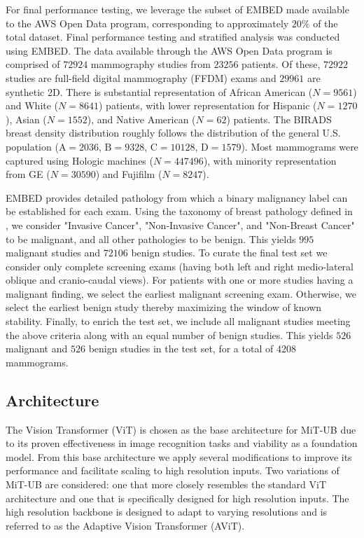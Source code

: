 \documentclass[12pt]{article}
\begin{document}
For final performance testing, we leverage the subset of EMBED \cite{embed2023} made available to the AWS Open Data program, 
corresponding to approximately $20\%$ of the total dataset.
Final performance testing and stratified analysis was conducted using EMBED. The data available through the AWS Open Data program is comprised of $72924$ mammography studies from $23256$ patients. Of these, $72922$ studies are  full-field digital mammography (FFDM) exams and $29961$ are synthetic 2D.
There is substantial representation of African American ($N=9561$) and White ($N=8641$) patients, with lower representation for Hispanic ($N=1270$), Asian ($N=1552$), and Native American ($N=62$) patients. The BIRADS breast density distribution roughly follows the distribution of the general U.S. population ($\mathrm{A}=2036$, $\mathrm{B}=9328$, $\mathrm{C}=10128$, $\mathrm{D}=1579$). Most mammograms were captured using Hologic machines ($N=447496$), with minority representation from GE ($N=30590$) and Fujifilm ($N=8247$).

EMBED provides detailed pathology from which a binary malignancy label can be established for each exam. Using the taxonomy
of breast pathology defined in \cite{embed2023}, we consider "Invasive Cancer", "Non-Invasive Cancer", and "Non-Breast Cancer" to be malignant, and all other pathologies to be benign. This yields $995$ malignant studies and $72106$ benign studies.
To curate the final test set we consider only complete screening exams (having both left and right medio-lateral oblique and cranio-caudal views). For patients with one or more studies having a malignant finding, we select the earliest malignant screening exam.
Otherwise, we select the earliest benign study thereby maximizing the window of known stability. 
Finally, to enrich the test set, we include all malignant studies meeting the above criteria along with an equal number of benign studies. 
This yields $526$ malignant and $526$ benign studies in the test set, for a total of $4208$ mammograms.

\subsection{Architecture}

The Vision Transformer (ViT) \cite{dosovitskiy2020vit} is chosen as the base architecture for MiT-UB due to its proven effectiveness in image recognition tasks and viability as a foundation model. From this base architecture we apply several
modifications to improve its performance and facilitate scaling to high resolution inputs. Two variations of MiT-UB are
considered: one that more closely resembles the standard ViT architecture and one that is specifically designed for high resolution inputs. The high resolution backbone is designed to adapt to varying resolutions
and is referred to as the Adaptive Vision Transformer (AViT).
\end{document}
